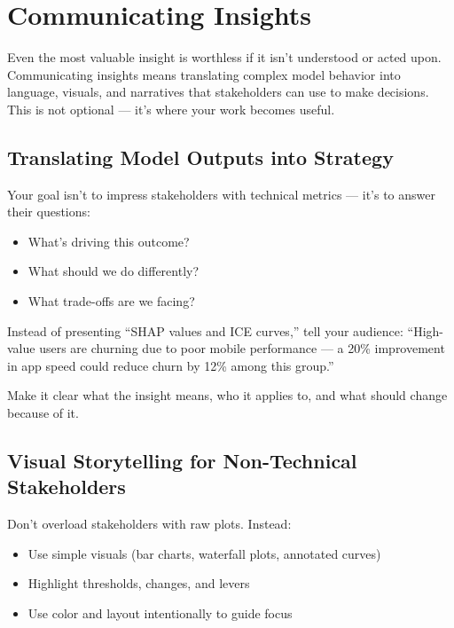 \documentclass[12pt,openany, draft]{book}
\begin{document}
\chapter{Communicating Insights}

Even the most valuable insight is worthless if it isn’t understood or acted upon. Communicating insights means translating complex model behavior into language, visuals, and narratives that stakeholders can use to make decisions. This is not optional — it’s where your work becomes useful.



\section{Translating Model Outputs into Strategy}

Your goal isn’t to impress stakeholders with technical metrics — it’s to answer their questions:
\begin{itemize}
  \item What’s driving this outcome?
  \item What should we do differently?
  \item What trade-offs are we facing?
\end{itemize}

\begin{examplebox}
Instead of presenting “SHAP values and ICE curves,” tell your audience: “High-value users are churning due to poor mobile performance — a 20\% improvement in app speed could reduce churn by 12\% among this group.”
\end{examplebox}

Make it clear what the insight means, who it applies to, and what should change because of it.



\section{Visual Storytelling for Non-Technical Stakeholders}

Don’t overload stakeholders with raw plots. Instead:
\begin{itemize}
  \item Use simple visuals (bar charts, waterfall plots, annotated curves)
  \item Highlight thresholds, changes, and levers
  \item Use color and layout intentionally to guide focus
\end{itemize}
\end{document}

